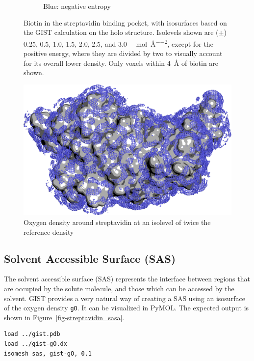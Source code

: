 \documentclass[9pt,tutorial]{livecoms}
\newcommand{\code}{\texttt}
\begin{document}
\begin{figure}
\begin{subfigure}[b]{0.45\textwidth}
		\caption{Blue: negative entropy}
		\label{fig-binding-pocket-entropy}
	\end{subfigure}
	\caption{Biotin in the streptavidin binding pocket, with isosurfaces based on the GIST calculation on the holo structure. 
	Isolevels shown are ($\pm$) 0.25, 0.5, 1.0, 1.5, 2.0, 2.5, and 3.0 \si{\kilo\calorie\per\mole\per\square\angstrom}, except for 
	the positive energy, where they are divided by two to visually account for its overall lower density. Only voxels within \SI{4}{\angstrom} of biotin are shown.}
	\label{fig-binding-pocket}
\end{figure}

\begin{figure}
	\centering
	\includegraphics[width=1\linewidth]{figures/streptavidin_gO_high_surf.png}
	\caption{Oxygen density around streptavidin at an isolevel of twice the reference density}
	\label{fig-streptavidin_gO}
\end{figure}

\subsection{Solvent Accessible Surface (SAS)}

The solvent accessible surface (SAS) represents the interface between regions that are occupied by the solute molecule, and those which can be accessed by the solvent.
GIST provides a very natural way of creating a SAS using an isosurface of the oxygen density \code{gO}.
It can be visualized in PyMOL.
The expected output is shown in Figure~\ref{fig-streptavidin_sasa}.

\begin{lstlisting}[style=pymol]
load ../gist.pdb
load ../gist-gO.dx
isomesh sas, gist-gO, 0.1
\end{lstlisting}
\end{document}
